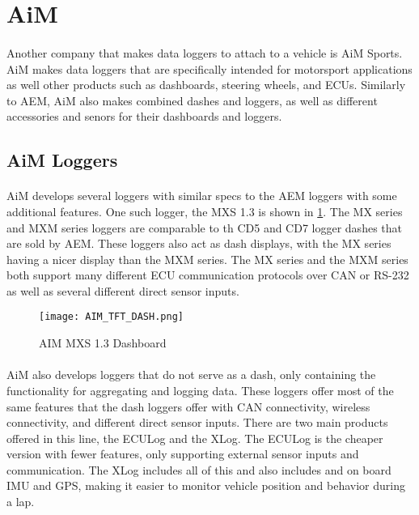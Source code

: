 \section{AiM}

\paragraph{}
Another company that makes data loggers to attach to a vehicle is AiM Sports\cite{AiMSite}.
AiM makes data loggers that are specifically intended for motorsport applications as well other products such as dashboards, steering wheels, and ECUs.
Similarly to AEM, AiM also makes combined dashes and loggers, as well as different accessories and senors for their dashboards and loggers.

\subsection{AiM Loggers}

\paragraph{}
AiM develops several loggers with similar specs to the AEM loggers with some additional features.
One such logger, the MXS 1.3 is shown in \cref{fig:AIM_TFT}.
The MX series and MXM series loggers are comparable to th CD5 and CD7 logger dashes that are sold by AEM.
These loggers also act as dash displays, with the MX series having a nicer display than the MXM series.
The MX series and the MXM series both support many different ECU communication protocols over CAN or RS-232 as well as several different direct sensor inputs.

\begin{figure}[H]
	\centering
	\texttt{[image: AIM\_TFT\_DASH.png]}
	\caption{AIM MXS 1.3 Dashboard}
	\label{fig:AIM_TFT}
\end{figure}

\paragraph{}
AiM also develops loggers that do not serve as a dash, only containing the functionality for aggregating and logging data.
These loggers offer most of the same features that the dash loggers offer with CAN connectivity, wireless connectivity, and different direct sensor inputs.
There are two main products offered in this line, the ECULog and the XLog.
The ECULog is the cheaper version with fewer features, only supporting external sensor inputs and communication.
The XLog includes all of this and also includes and on board IMU and GPS, making it easier to monitor vehicle position and behavior during a lap.

